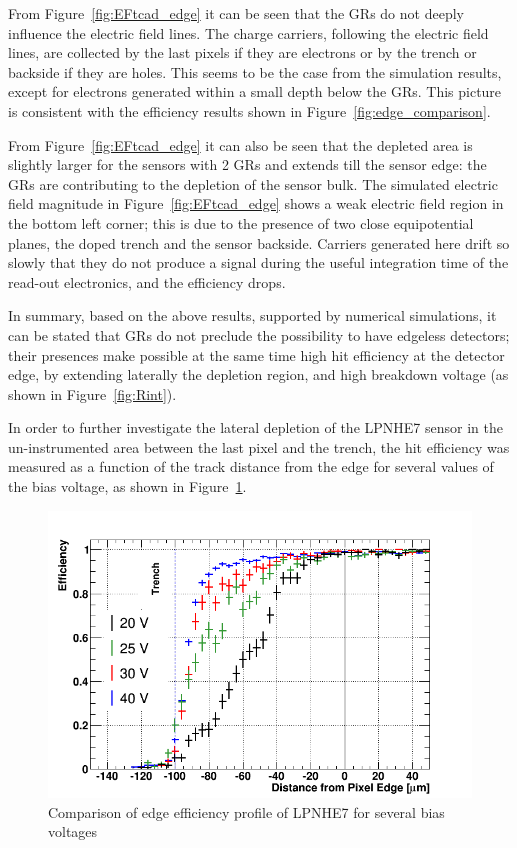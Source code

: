  From Figure~\ref{fig:EFtcad_edge} it can be seen that the GRs do not  deeply influence the electric field lines. The charge carriers, following the electric field lines, are collected by the last pixels if they are electrons or by the trench or backside if they are holes. This seems to be the case from the simulation results, except for electrons generated within a small depth below the GRs. This picture is consistent with the efficiency
 results shown in Figure~\ref{fig:edge_comparison}.

From Figure~\ref{fig:EFtcad_edge} it can also be  seen that the depleted area is slightly larger for the sensors with 2 GRs and extends till the sensor edge: the GRs are contributing to the depletion of the
 sensor bulk.
The simulated electric field magnitude in Figure~\ref{fig:EFtcad_edge} shows a weak electric field region in the bottom left corner; this is due to the presence of two close equipotential planes, the doped trench and the sensor backside. Carriers generated here drift so slowly that they do not produce a signal during the useful integration time of the read-out electronics, and the efficiency drops.

In summary, based on the above results, supported by numerical  simulations, it can be stated that GRs do not preclude the possibility to have edgeless detectors; their presences make possible at the same time high hit efficiency at the detector edge, by extending laterally the depletion region, and high breakdown voltage (as shown in Figure~\ref{fig:Rint}).




In order to further investigate the lateral depletion of the LPNHE7 sensor in the un-instrumented area between the last pixel and the trench, the hit efficiency   was measured as a function of the track distance from  the edge  for several values of the bias voltage, as shown in Figure~\ref{fig:comparison2}.

\begin{figure}[htbp]
\centering
\includegraphics[width=.65\textwidth,origin=c,angle=0]{eff_40V_bin4.png}
\caption{\label{fig:comparison2} Comparison of edge efficiency profile of LPNHE7 for several bias voltages}
\end{figure}

